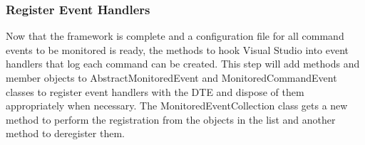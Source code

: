 \newpage



\subsubsection{Register Event Handlers}

Now that the framework is complete and a configuration file for all command events to be monitored is ready, the methods to hook Visual Studio into event handlers that log each command can be created.  This step will add methods and member objects to AbstractMonitoredEvent and MonitoredCommandEvent classes to register event handlers with the DTE and dispose of them appropriately when necessary.  The MonitoredEventCollection class gets a new method to perform the registration from the objects in the list and another method to deregister them.

